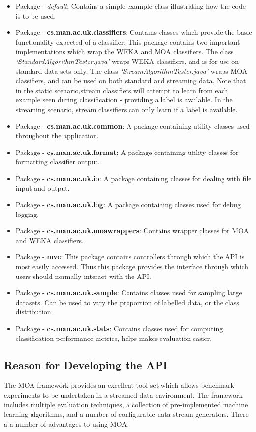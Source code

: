 \documentclass[twoside,a4paper]{refart}
\begin{document}
\begin{itemize}
\item{Package - \textit{default}:} Contains a simple example class illustrating how the code is to be used.
\item{Package - \textbf{cs.man.ac.uk.classifiers}:} Contains classes which provide the basic functionality expected of a classifier. This package contains two important implementations which wrap the WEKA and MOA classifiers. The class \textit{`StandardAlgorithmTester.java'} wraps WEKA classifiers, and is for use on standard data sets only. The class \textit{`StreamAlgorithmTester.java'} wraps MOA classifiers, and can be used on both standard and streaming data. Note that in the static scenario,stream classifiers will attempt to learn from each example seen during classification - providing a label is available. In the streaming scenario, stream classifiers can only learn if a label is available.
\item{Package - \textbf{cs.man.ac.uk.common}:} A package containing utility classes used throughout the application.
\item{Package - \textbf{cs.man.ac.uk.format}:} A package containing utility classes for formatting classifier output.
\item{Package - \textbf{cs.man.ac.uk.io}:} A package containing classes for dealing with file input and output.
\item{Package - \textbf{cs.man.ac.uk.log}:} A package containing classes used for debug logging. 
\item{Package - \textbf{cs.man.ac.uk.moawrappers}:} Contains wrapper classes for MOA and WEKA classifiers.
\item{Package - \textbf{mvc}:} This package contains controllers through which the API is most easily accessed. Thus this package provides the interface through which users should normally interact with the API.
\item{Package - \textbf{cs.man.ac.uk.sample}:} Contains classes used for sampling large datasets. Can be used to vary the proportion of labelled data, or the class distribution.
\item{Package - \textbf{cs.man.ac.uk.stats}:} Contains classes used for computing classification performance metrics, helps makes evaluation easier.
\end{itemize}

\subsection{Reason for Developing the API}
The MOA framework provides an excellent tool set which allows benchmark experiments to be undertaken in a streamed data environment. The framework includes multiple evaluation techniques, a collection of pre-implemented machine learning algorithms, and a number of configurable data stream generators. There a a number of advantages to using MOA: 
\end{document}
